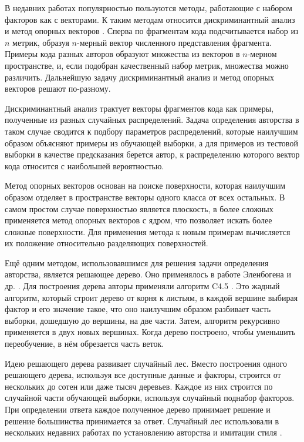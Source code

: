 В недавних работах популярностью пользуются методы, работающие с набором факторов как с векторами. К таким методам относится дискриминантный анализ \cite{Ding2004, Hayes2008, Hayes2010} и метод опорных векторов \cite{Rosenblum2011, Wisse2015, Meng2016}. Сперва по фрагментам кода подсчитывается набор из $n$ метрик, образуя $n$-мерный вектор численного представления фрагмента. Примеры кода разных авторов образуют множества из векторов в $n$-мерном пространстве, и, если подобран качественный набор метрик, множества можно различить. Дальнейшую задачу дискриминантный анализ и метод опорных векторов решают по-разному. 

Дискриминантный анализ трактует векторы фрагментов кода как примеры, полученные из разных случайных распределений. Задача определения авторства в таком случае сводится к подбору параметров распределений, которые наилучшим образом объясняют примеры из обучающей выборки, а для примеров из тестовой выборки в качестве предсказания берется автор, к распределению которого вектор кода относится с наибольшей вероятностью.

Метод опорных векторов основан на поиске поверхности, которая наилучшим образом отделяет в пространстве векторы одного класса от всех остальных. В самом простом случае поверхностью является плоскость, в более сложных применяется метод опорных векторов с ядром, что позволяет искать более сложные поверхности. Для применения метода к новым примерам вычисляется их положение относительно разделяющих поверхностей.

Ещё одним методом, использовавшимся для решения задачи определения авторства, является решающее дерево. Оно применялось в работе Эленбогена и др. \cite{Elenbogen2008}. Для построения дерева авторы применяли алгоритм C4.5 \cite{Quinlan1993}. Это жадный алгоритм, который строит дерево от корня к листьям, в каждой вершине выбирая фактор и его значение такое, что оно наилучшим образом разбивает часть выборки, дошедшую до вершины, на две части. Затем, алгоритм рекурсивно применяется в двух новых вершинах. Когда дерево построено, чтобы уменьшить переобучение, в нём обрезается часть веток.

Идею решающего дерева развивает случайный лес. Вместо построения одного решающего дерева, используя все доступные данные и факторы, строится от нескольких до сотен или даже тысяч деревьев. Каждое из них строится по случайной части обучающей выборки, используя случайный поднабор факторов.  При определении ответа каждое полученное дерево принимает решение и решение большинства принимается за ответ.  Случайный лес использовали в нескольких недавних работах по установлению авторства \cite{Caliskan2015} и имитации стиля \cite{Simko2018}.


